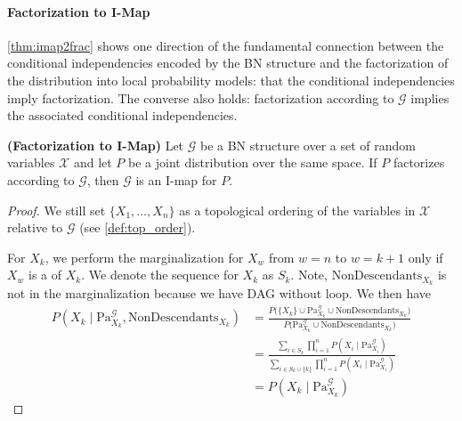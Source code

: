 \documentclass{article}
\newcommand{\bfs}[1]{\textbf{({#1}) }}
\begin{document}
\paragraph{Factorization to I-Map}
\cref{thm:imap2frac} shows one direction of the fundamental connection between the conditional independencies encoded by the BN structure and the factorization of the distribution into local probability models: that the conditional independencies imply factorization. The converse also holds: factorization according to $\mathcal{G}$ implies the associated conditional independencies.
\begin{thma}\bfs{Factorization to I-Map}\label{thm:frac2imap}
Let $\mathcal{G}$ be a BN structure over a set of random variables $\mathcal{X}$ and let $P$ be a joint distribution over the same space. If $P$ factorizes according to $\mathcal{G}$, then $\mathcal{G}$ is an I-map for $P$.
\end{thma}
\begin{proof}
We still set  $\{X_{1}, \ldots, X_{n}\}$ as a topological ordering of the variables in $\mathcal{X}$ relative to $\mathcal{G}$ (see \cref{def:top_order}). %

For $X_k$, we perform the marginalization for $X_w$  from $w=n$ to $w=k+1$ only if $X_w$ is a  of  $X_k$. We denote the sequence for $X_k$ as $S_k$. Note, $\mathrm{NonDescendants}_{X_{k}}$ is not in the marginalization because we have DAG without loop.
We then have 
    \begin{align*}
        P\left(X_{k} \mid \mathrm{Pa}_{X_{k}}^{\mathcal{G}}, \mathrm{NonDescendants}_{X_{k}}\right) & = \frac{P\bigg(\{X_k\}\cup\mathrm{Pa}_{X_{k}}^{\mathcal{G}}\cup \mathrm{NonDescendants}_{X_{k}}\bigg)}{P\bigg(\mathrm{Pa}_{X_{k}}^{\mathcal{G}}\cup \mathrm{NonDescendants}_{X_{k}}\bigg)}\\
        & = \frac{\sum_{i\in S_k} \prod_{i=1}^{n} P\left(X_{i} \mid \mathrm{Pa}_{X_{i}}^{\mathcal{G}}\right)}{\sum_{i\in S_k\cup\{k\}}\prod_{i=1}^{n} P\left(X_{i} \mid \mathrm{Pa}_{X_{i}}^{\mathcal{G}}\right)}\\
        & =  P\left(X_{k} \mid \mathrm{Pa}_{X_{k}}^{\mathcal{G}}\right)
    \end{align*}



\end{proof}
\end{document}

